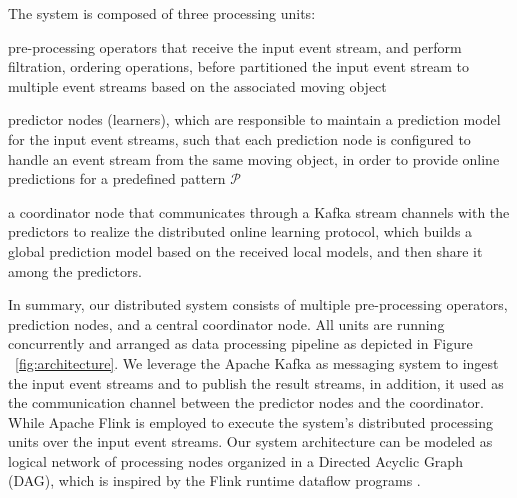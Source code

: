 The system is composed of three processing units:   \begin{enumerate*}[(i)]
	\item pre-processing operators that receive the input event stream, and perform filtration, ordering operations, before partitioned the input event stream to multiple event streams based on the associated moving object 
	\item predictor nodes (learners), which are responsible to maintain a prediction model for the input event streams, such that each prediction node is configured to handle an event stream from the same moving object, in order to provide online predictions for a predefined pattern $\mathcal{P}$  
	\item a coordinator node that communicates through a Kafka stream channels with the predictors to realize the distributed online learning protocol, which builds a global prediction model based on the received local models, and then share it among the predictors.
\end{enumerate*}

\par In summary, our distributed system consists of multiple pre-processing operators, prediction nodes,  and a central coordinator node. All units are running concurrently and arranged as data processing pipeline as depicted in Figure ~\ref{fig:architecture}. We leverage the Apache Kafka as messaging system to ingest the input event streams and to publish the result streams, in addition, it used as the communication channel between the predictor nodes and the coordinator. While Apache Flink is employed to execute the system's distributed processing units over the input event streams. Our system architecture can be modeled as logical network of processing nodes  organized in a Directed Acyclic Graph (DAG), which is inspired by the Flink runtime dataflow programs \cite{carbone2015apache}.  
